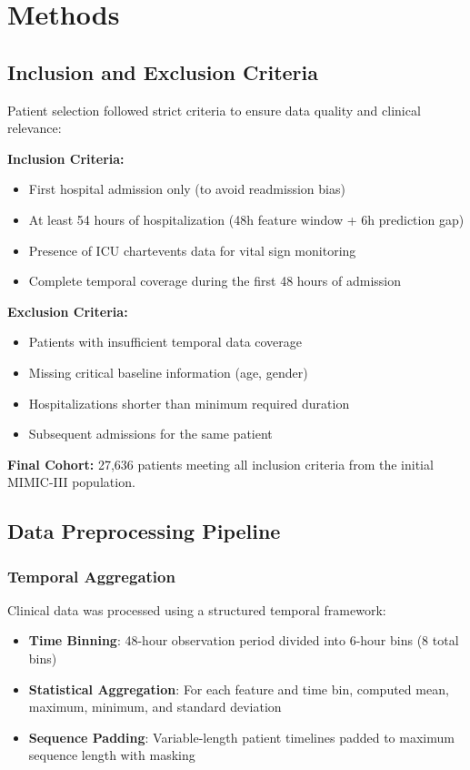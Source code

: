 \documentclass[11pt]{article}
\begin{document}
\section{Methods}

\subsection{Inclusion and Exclusion Criteria}

Patient selection followed strict criteria to ensure data quality and clinical relevance:

\textbf{Inclusion Criteria:}
\begin{itemize}
    \item First hospital admission only (to avoid readmission bias)
    \item At least 54 hours of hospitalization (48h feature window + 6h prediction gap)
    \item Presence of ICU chartevents data for vital sign monitoring
    \item Complete temporal coverage during the first 48 hours of admission
\end{itemize}

\textbf{Exclusion Criteria:}
\begin{itemize}
    \item Patients with insufficient temporal data coverage
    \item Missing critical baseline information (age, gender)
    \item Hospitalizations shorter than minimum required duration
    \item Subsequent admissions for the same patient
\end{itemize}

\textbf{Final Cohort:} 27,636 patients meeting all inclusion criteria from the initial MIMIC-III population.

\subsection{Data Preprocessing Pipeline}

\subsubsection{Temporal Aggregation}
Clinical data was processed using a structured temporal framework:
\begin{itemize}
    \item \textbf{Time Binning}: 48-hour observation period divided into 6-hour bins (8 total bins)
    \item \textbf{Statistical Aggregation}: For each feature and time bin, computed mean, maximum, minimum, and standard deviation
    \item \textbf{Sequence Padding}: Variable-length patient timelines padded to maximum sequence length with masking
\end{itemize}
\end{document}
